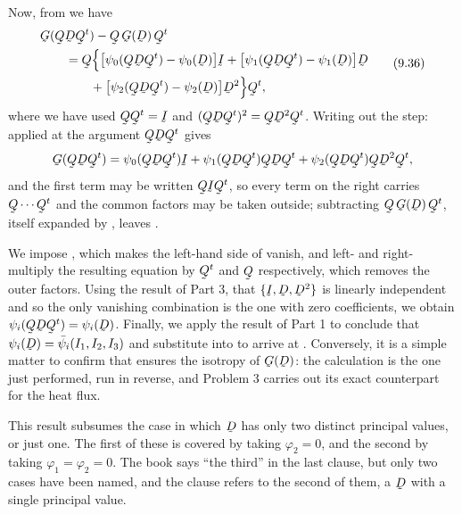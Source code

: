 Now, from  we have
\begin{equation}
\begin{aligned}
   &\bG(\bQ\bD\bQ^{t})-\bQ\,\bG(\bD)\,\bQ^{t}\\
   &\qquad=\bQ\Big\{\big[\psi_{0}(\bQ\bD\bQ^{t})-\psi_{0}(\bD)\big]\I
    +\big[\psi_{1}(\bQ\bD\bQ^{t})-\psi_{1}(\bD)\big]\bD\\
   &\qquad\qquad
    +\big[\psi_{2}(\bQ\bD\bQ^{t})-\psi_{2}(\bD)\big]\bD^{2}\Big\}\bQ^{t},
\end{aligned}
   \tag{9.36}\label{eq:9.36}
\end{equation}
where we have used $\bQ\bQ^{t}=\I$ and $(\bQ\bD\bQ^{t})^{2}
=\bQ\bD^{2}\bQ^{t}$. Writing out the step:  applied at the
argument $\bQ\bD\bQ^{t}$ gives
\[
   \bG(\bQ\bD\bQ^{t})=\psi_{0}(\bQ\bD\bQ^{t})\I
   +\psi_{1}(\bQ\bD\bQ^{t})\bQ\bD\bQ^{t}
   +\psi_{2}(\bQ\bD\bQ^{t})\bQ\bD^{2}\bQ^{t},
\]
and the first term may be written $\bQ\I\bQ^{t}$, so every term on the
right carries $\bQ\cdots\bQ^{t}$ and the common factors may be taken
outside; subtracting $\bQ\,\bG(\bD)\,\bQ^{t}$, itself expanded by
, leaves .

We impose , which makes the left-hand side of 
vanish, and left- and right-multiply the resulting equation by $\bQ^{t}$
and $\bQ$ respectively, which removes the outer factors. Using the
result of Part 3, that $\{\I,\bD,\bD^{2}\}$ is linearly independent and
so the only vanishing combination is the one with zero coefficients, we
obtain $\psi_{i}(\bQ\bD\bQ^{t})=\psi_{i}(\bD)$. Finally, we apply the
result of Part 1 to conclude that
$\psi_{i}(\bD)=\bar\psi_{i}(I_{1},I_{2},I_{3})$ and substitute into
 to arrive at . Conversely, it is a simple matter to
confirm that  ensures the isotropy of $\bG(\bD)$: the
calculation is the one just performed, run in reverse, and Problem 3
carries out its exact counterpart for the heat flux.

This result subsumes the case in which $\bD$ has only two distinct
principal values, or just one. The first of these is covered by taking
$\varphi_{2}=0$, and the second by taking $\varphi_{1}=\varphi_{2}=0$.
The book says ``the third'' in the last clause, but only two cases have
been named, and the clause refers to the second of them, a $\bD$ with a
single principal value.

